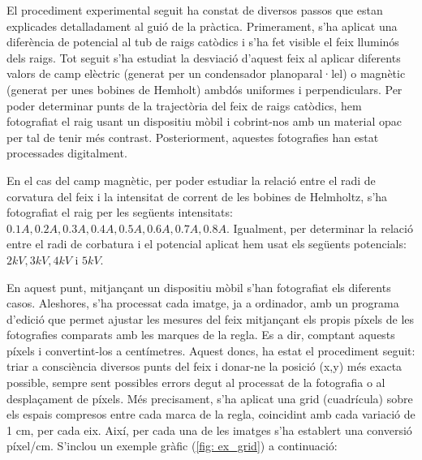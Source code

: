 \documentclass[11pt]{article}
\begin{document}
El procediment experimental seguit ha constat de diversos passos que estan explicades detalladament al guió de la pràctica. 
Primerament, s'ha aplicat una diferència de potencial al tub de raigs catòdics i s'ha fet visible el feix lluminós dels raigs. Tot seguit s'ha estudiat la desviació d'aquest feix al aplicar diferents valors de camp elèctric (generat per un condensador planoparal·lel) o magnètic (generat per unes bobines de Hemholt) ambdós uniformes i perpendiculars. Per poder determinar punts de la trajectòria del feix de raigs catòdics, hem fotografiat el raig usant un dispositiu mòbil i cobrint-nos amb un material opac per tal de tenir més contrast. Posteriorment, aquestes fotografies han estat processades digitalment.

En el cas del camp magnètic, per poder estudiar la relació entre el radi de corvatura del feix i la intensitat de corrent de les bobines de Helmholtz, s'ha fotografiat el raig per les següents intensitats:  $0.1A, 0.2A, 0.3A, 0.4A, 0.5A, 0.6A, 0.7A, 0.8A$. Igualment, per determinar la relació entre el radi de corbatura i el potencial aplicat hem usat els següents potencials: $2kV, 3kV, 4kV$ i $5kV$.

En aquest punt, mitjançant un dispositiu mòbil s'han fotografiat els diferents casos. Aleshores, s'ha processat cada imatge, ja a ordinador, amb un programa d'edició que permet ajustar les mesures del feix mitjançant els propis píxels de les fotografies comparats amb les marques de la regla. Es a dir, comptant aquests píxels i convertint-los a centímetres. Aquest doncs, ha estat el procediment seguit: triar a consciència diversos punts del feix i donar-ne la posició (x,y) més exacta possible, sempre sent possibles errors degut al processat de la fotografia o al desplaçament de píxels. Més precisament, s'ha aplicat una grid (cuadrícula) sobre els espais compresos entre cada marca de la regla, coincidint amb cada variació de 1 cm, per cada eix. Així, per cada una de les imatges s'ha establert una conversió píxel/cm. S'inclou un exemple gràfic (\ref{fig: ex_grid}) a continuació:
\end{document}
